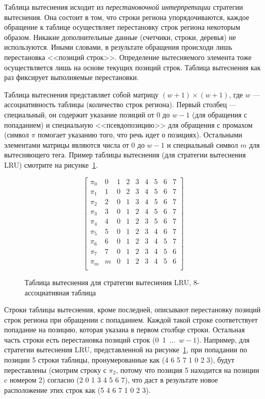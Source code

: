\documentclass[14pt]{extreport}
\newcommand{\LRU}{\textsf{LRU}\xspace}
\begin{document}
Таблица вытеснения исходит из \emph{перестановочной интерпретации} стратегии вытеснения. Она состоит в том, что строки региона упорядочиваются, каждое обращение к таблице осуществляет перестановку строк региона некоторым образом. Никакие дополнительные данные (счетчики, строки, деревья) не используются. Иными словами, в результате обращения происходи лишь перестановка <<позиций строк>>. Определение вытесняемого элемента тоже осуществляется лишь на основе текущих позиций строк. Таблица вытеснения как раз фиксирует выполняемые перестановки.

Таблица вытеснения представляет собой матрицу $(w{+}1) \times (w{+}1)$, где $w$
--- ассоциативность таблицы (количество строк региона). Первый столбец ---
специальный, он содержит указание позиций от 0 до $w{-}1$ (для обращения с попаданием) и
специальную <<псевдопозицию>> для обращения с промахом (символ $\pi$ помогает указанию того, что речь идет о позициях). Остальными элементами
матрицы являются числа от 0 до $w{-}1$ и специальный символ $m$ для
вытесняющего тега. Пример таблицы вытеснения (для стратегии
вытеснения \LRU) смотрите на рисунке~\ref{fig:PolicyTableLRU8}.

\begin{figure}[h]
$$ \left[
     \begin{array}{c|cccccccc}
       \pi_0 & 0 & 1 & 2 & 3 & 4 & 5 & 6 & 7 \\
       \pi_1 & 1 & 0 & 2 & 3 & 4 & 5 & 6 & 7 \\
       \pi_2 & 2 & 0 & 1 & 3 & 4 & 5 & 6 & 7 \\
       \pi_3 & 3 & 0 & 1 & 2 & 4 & 5 & 6 & 7 \\
       \pi_4 & 4 & 0 & 1 & 2 & 3 & 5 & 6 & 7 \\
       \pi_5 & 5 & 0 & 1 & 2 & 3 & 4 & 6 & 7 \\
       \pi_6 & 6 & 0 & 1 & 2 & 3 & 4 & 5 & 7 \\
       \pi_7 & 7 & 0 & 1 & 2 & 3 & 4 & 5 & 6 \\
       \pi_m & m & 0 & 1 & 2 & 3 & 4 & 5 & 6 \\
     \end{array}
   \right]
$$
\caption{Таблица вытеснения для стратегии вытеснения \LRU,
8-ассоциативная таблица}\label{fig:PolicyTableLRU8}
\end{figure}

Строки таблицы вытеснения, кроме последней, описывают перестановку позиций строк региона при обращении с попаданием. Каждой такой строке соответствует попадание на позицию, которая указана в первом столбце строки. Остальная часть строки есть перестановка позиций строк (0~1~...~$w{-}1$). Например, для стратегии вытеснения \LRU,
представленной на рисунке~\ref{fig:PolicyTableLRU8}, при попадании по позиции 5 строки таблицы, пронумерованные как (4 6 5 7 1 0 2 3), будут переставлены (смотрим строку с $\pi_2$, потому что позиция 5 находится на позиции c номером 2) согласно (2 0 1 3 4 5 6 7), что даст в результате новое расположение этих строк как (5 4 6 7 1 0 2 3).
\end{document}
